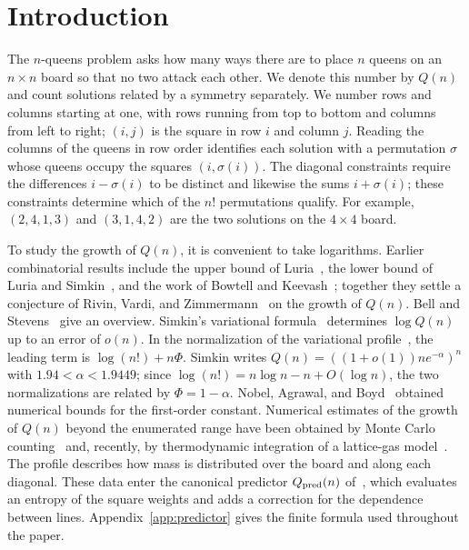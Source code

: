 \section{Introduction}
The $n$-queens problem asks how many ways there are to place $n$ queens on an $n\times n$ board so that
no two attack each other. We denote this number by $Q(n)$ and count solutions related by a symmetry
separately. We number rows and columns starting at one, with rows running from top to bottom and columns
from left to right; $(i,j)$ is the square in row $i$ and column $j$. Reading the columns of the queens in
row order identifies each solution with a permutation $\sigma$ whose queens occupy the squares
$(i,\sigma(i))$. The diagonal constraints require the differences $i-\sigma(i)$ to be distinct and
likewise the sums $i+\sigma(i)$; these constraints determine which of the $n!$ permutations qualify. For
example, $(2,4,1,3)$ and $(3,1,4,2)$ are the two solutions on the $4\times4$ board.

To study the growth of $Q(n)$, it is convenient to take logarithms. Earlier combinatorial results include
the upper bound of Luria~\cite{luria}, the lower bound of Luria and Simkin~\cite{ls}, and the work of
Bowtell and Keevash~\cite{bk}; together they settle a conjecture of Rivin, Vardi, and
Zimmermann~\cite{rvz} on the growth of $Q(n)$. Bell and Stevens~\cite{bs} give an overview. Simkin's
variational
formula~\cite{simkin} determines $\log Q(n)$ up to an error of $o(n)$. In the normalization of the
variational profile~\cite{pv}, the leading term is $\log(n!)+n\Phi$. Simkin writes
$Q(n)=((1+o(1))ne^{-\alpha})^n$ with $1.94<\alpha<1.9449$; since $\log(n!)=n\log n-n+O(\log n)$, the two
normalizations are related by $\Phi=1-\alpha$. Nobel, Agrawal, and Boyd~\cite{nab}
obtained numerical bounds for the first-order constant. Numerical estimates of the growth of $Q(n)$
beyond the enumerated range have been obtained by Monte Carlo counting~\cite{zm} and, recently, by
thermodynamic integration of a lattice-gas model~\cite{llw}. The profile describes how mass is
distributed over the board and along each diagonal. These data enter the canonical predictor
$Q_{\rm pred}(n)$ of~\cite{pc}, which evaluates an entropy of the square weights and adds a correction
for the dependence between lines. Appendix~\ref{app:predictor} gives the finite formula used throughout the
paper.

